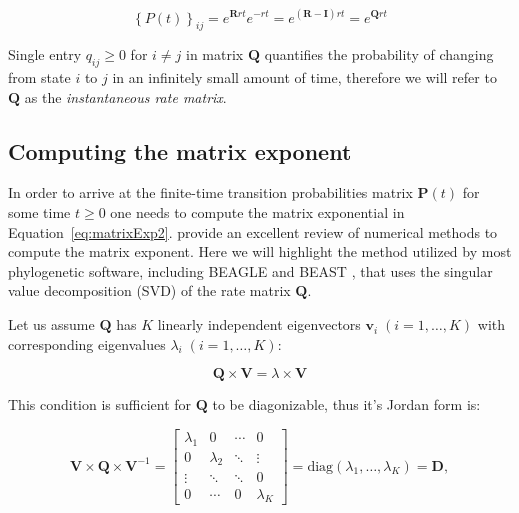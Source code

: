 \begin{equation}
\left\{ P(t)\right\} _{ij}=e^{\mathbf{R}r t}e^{-r t} =e^{(\mathbf{R}-\mathbf{I})r t}=e^{\mathbf{Q}r t} 
\label{eq:matrixExp2}
\end{equation}

\noindent
Single entry $q_{ij} \ge 0$ for $i \neq j$ in matrix $\mathbf{Q}$ quantifies the probability of changing from state $i$ to $j$ in an infinitely small amount of time, therefore we will refer to $\mathbf{Q}$ as the \emph{instantaneous rate matrix}.

\subsection{Computing the matrix exponent \label{sub:exponentiation}}

In order to arrive at the finite-time transition probabilities matrix $\mathbf{P}(t)$ for some time $t\geq0$ one needs to compute the matrix exponential in Equation~\ref{eq:matrixExp2}.
\cite{Moler1978} provide an excellent review of numerical methods to compute the matrix exponent. 
Here we will highlight the method utilized by most phylogenetic software, including BEAGLE \citep{Ayres2012} and BEAST \citep{Drummond2012}, that uses the singular value decomposition (SVD) of the rate matrix $\mathbf{Q}$.   

Let us assume $\mathbf{Q}$ has $K$ linearly independent eigenvectors $\mathbf{v}_{i} \; (i=1,\ldots,K)$ with corresponding eigenvalues $\lambda_{i}\;(i=1,\ldots,K)$:

\begin{equation}
\mathbf{Q}\times\mathbf{V}=\lambda\times\mathbf{V}
\label{eq:eigenvaluesEigenvectors}
\end{equation}

\noindent
This condition is sufficient for $\mathbf{Q}$ to be diagonizable, thus it's Jordan form is:

\begin{equation}
\mathbf{V}\times\mathbf{Q}\times\mathbf{V}^{-1}=\left[\begin{array}{cccc}
\lambda_{1} & 0 & \cdots & 0\\
0 & \lambda_{2} & \ddots & \vdots\\
\vdots & \ddots & \ddots & 0\\
0 & \cdots & 0 & \lambda_{K}
\end{array}\right]=\text{diag}(\lambda_{1},\ldots,\lambda_{K})=\mathbf{D} ,
\label{eq:diagonalization}
\end{equation}

